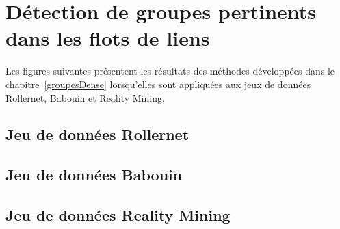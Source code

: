 \appendix
\chapter{Détection de groupes pertinents dans les flots de liens}
Les figures suivantes présentent les résultats des méthodes développées dans le chapitre~\ref{groupesDense} lorsqu'elles sont appliquées aux jeux de données Rollernet, Babouin et Reality Mining.


\section{Jeu de données Rollernet}
\clearpage
{}

\clearpage
\section{Jeu de données Babouin}
\clearpage
{}
\clearpage

\section{Jeu de données Reality Mining}

\clearpage
{}

\clearpage